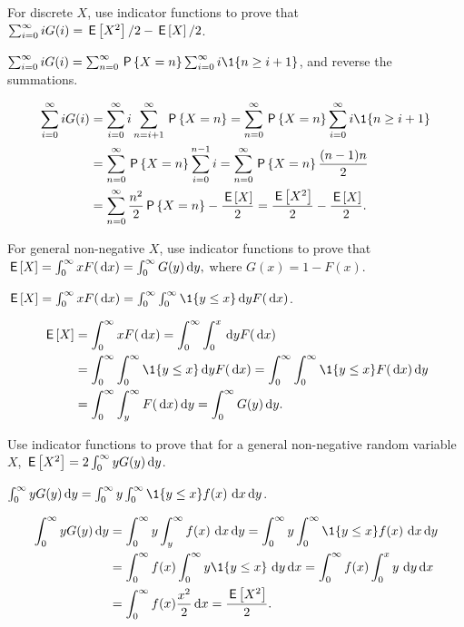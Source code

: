 \documentclass[queueing_book]{subfiles}
\begin{document}
\begin{exercise}\label{ex:66}
For discrete $X$,  use indicator functions to prove that
$\sum_{i=0}^\infty i G(i) = \,\mathsf{E}\left[X^2\right]/2 - \,\mathsf{E}\left[X\right]/2$.
\begin{hint}
$\sum_{i=0}^\infty i G(i) = \sum_{n=0}^\infty \P{X=n} \sum_{i=0}^\infty i \1{n\geq i+1}$,
and reverse the summations.
\end{hint}
\begin{solution}
\begin{align*}
\sum_{i=0}^\infty i G(i)
&= \sum_{i=0}^\infty i \sum_{n=i+1}^\infty \P{X=n} = \sum_{n=0}^\infty \P{X=n} \sum_{i=0}^\infty i \1{n\geq i+1} \\
&= \sum_{n=0}^\infty \P{X=n} \sum_{i=0}^{n-1}i = \sum_{n=0}^\infty \P{X=n} \frac{(n-1)n}{2} \\
&= \sum_{n=0}^\infty \frac{n^2}{2} \P{X=n} - \frac{\E X}{2}
= \frac{\E{X^2}}{2} - \frac{\E X}{2}.
\end{align*}
\end{solution}
\end{exercise}

\begin{exercise}\label{ex:l-107}
For  general non-negative $X$,  use indicator functions to prove that 
$ \,\mathsf{E}\left[X\right] = \int_0^\infty x F(\,\textrm{d}x) = \int_0^\infty G(y) \,\textrm{d}y,$
where $G(x) = 1 - F(x)$. 
\begin{hint}
$\E X = \int_0^\infty x F(\d x) = \int_0^\infty \int_0^\infty \1{y\leq x} \d y F(\d x)$.
\end{hint}
\begin{solution}
 \begin{align*}
 \E{X} &= \int_0^\infty x F(\d x) = \int_0^\infty \int_0^x \d y F(\d x) \\
 & = \int_0^\infty \int_0^\infty \1{y\leq x} \d y F(\d x) = \int_0^\infty \int_0^\infty \1{y\leq x} F(\d x) \d y\\
 & = \int_0^\infty \int_y^\infty F(\d x) \d y = \int_0^\infty G(y) \d y.
 \end{align*}
\end{solution}
\end{exercise}


\begin{exercise}
  Use indicator functions to prove that for a general non-negative random variable~$X$, $ \,\mathsf{E}\left[X^2\right] = 2 \int_0^\infty y G(y) \,\textrm{d}y$.
\begin{hint}
$\int_0^\infty y G(y) \d y = \int_0^\infty y \int_0^\infty \1{y\leq x}f(x)\, \d x \d y$.
\end{hint}
\begin{solution}
 \begin{align*}
\int_0^\infty y G(y) \d y 
&= \int_0^\infty y \int_y^\infty f(x)\, \d x \d y = \int_0^\infty y \int_0^\infty \1{y\leq x}f(x)\, \d x \d y\\
&= \int_0^\infty f(x) \int_0^\infty y \1{y \leq x}\, \d y \d x
= \int_0^\infty f(x) \int_0^x y\, \d y \d x\\
&= \int_0^\infty f(x) \frac{x^2}2 \d x =\frac{\E{X^2}}2.
 \end{align*}
\end{solution}
\end{exercise}
\end{document}

